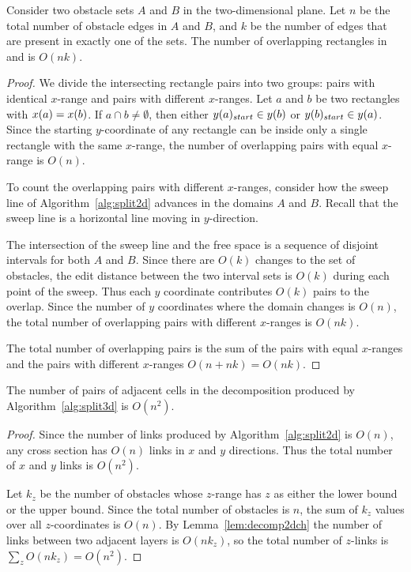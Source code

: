 \documentclass[english,gradu]{tktltiki2018}
\begin{document}
\begin{lem}\label{lem:decomp2dch}
Consider two obstacle sets $A$ and $B$ in the two-dimensional plane.
Let $n$ be the total number of obstacle edges in $A$ and $B$, and $k$ be the number of edges that are present in exactly one of the sets.
The number of overlapping rectangles in  and  is $O(nk)$.
\end{lem}
\begin{proof}
We divide the intersecting rectangle pairs into two groups:
pairs with identical $x$-range and pairs with different $x$-ranges.
Let $a$ and $b$ be two rectangles with $x(a)=x(b)$.
If $a\cap b\neq\emptyset$, then either $y(a)_{start}\in y(b)$ or $y(b)_{start}\in y(a)$.
Since the starting $y$-coordinate of any rectangle can be inside only a single rectangle with the same $x$-range, the number of overlapping pairs with equal $x$-range is $O(n)$.

To count the overlapping pairs with different $x$-ranges, consider how the sweep line of Algorithm~\ref{alg:split2d} advances in the domains $A$ and $B$.
Recall that the sweep line is a horizontal line moving in $y$-direction.

The intersection of the sweep line and the free space is a sequence of disjoint intervals for both $A$ and $B$.
Since there are $O(k)$ changes to the set of obstacles, the edit distance between the two interval sets is $O(k)$ during each point of the sweep.
Thus each $y$ coordinate contributes $O(k)$ pairs to the overlap.
Since the number of $y$ coordinates where the domain changes is $O(n)$, the total number of overlapping pairs with different $x$-ranges is $O(nk)$.

The total number of overlapping pairs is the sum of the pairs with equal $x$-ranges and the pairs with different $x$-ranges $O(n+nk)=O(nk)$.
\end{proof}

\begin{lem}\label{lem:split3dcount}The number of pairs of adjacent cells in the decomposition produced by Algorithm~\ref{alg:split3d} is $O(n^2)$.\end{lem}
\begin{proof}
Since the number of links produced by Algorithm~\ref{alg:split2d} is $O(n)$, any cross section has $O(n)$ links in $x$ and $y$ directions.
Thus the total number of $x$ and $y$ links is $O(n^2)$.

Let $k_z$ be the number of obstacles whose $z$-range has $z$ as either the lower bound or the upper bound.
Since the total number of obstacles is $n$, the sum of $k_z$ values over all $z$-coordinates is $O(n)$.
By Lemma~\ref{lem:decomp2dch} the number of links between two adjacent layers is $O(nk_z)$, so the total number of $z$-links is $\sum_z O(nk_z)=O(n^2)$.
\end{proof}
\end{document}

